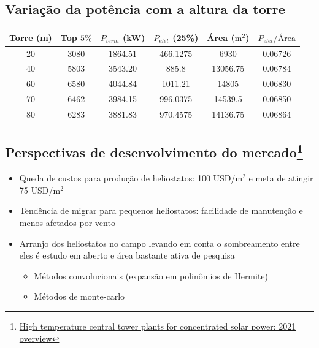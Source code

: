 \documentclass[12pt,notheorems,hyperref={pdfauthor= Rafael Nardi}]{beamer}
\begin{document}
\subsection{Variação da potência com a altura da torre}

\begin{frame}%
	\begin{table}
		\begin{tabular}[scale=0.7]{cccccc}
			\toprule
			Torre (m) & Top $5\%$ & $P_{term}$ (kW) & $P_{elet}$ (25\%) & Área ($\text{m}^2$) & $P_{elet} /\text{Área}$ \\
			\midrule
			20 & 3080 & 1864.51 & 466.1275 & 6930 & 0.06726 \\
			40 & 5803 & 3543.20 & 885.8 & 13056.75 & 0.06784 \\
			60 & 6580 & 4044.84 & 1011.21 & 14805 & 0.06830 \\
			70 & 6462 & 3984.15 & 996.0375 & 14539.5 & 0.06850 \\
			80 & 6283 & 3881.83 & 970.4575 & 14136.75 & 0.06864 \\
		\end{tabular}
	\end{table}
\end{frame}

\subsection{Perspectivas de desenvolvimento do mercado\footnote{\href{https://reader.elsevier.com/reader/sd/pii/S1364032121010923}{High temperature central tower plants for concentrated solar power: 2021 overview}}}

\begin{frame}
	\begin{itemize}
		\item Queda de custos para produção de heliostatos: 100 USD/$\text{m}^2$ e
			meta de atingir 75 USD/$\text{m}^2$ \pause
			\bigskip
		\item Tendência de migrar para pequenos heliostatos: facilidade de
			manutenção e menos afetados por vento\pause
			\bigskip
		\item Arranjo dos heliostatos no campo levando em conta o sombreamento
			entre eles é estudo em aberto e área bastante ativa de pesquisa
			\medskip
			\begin{itemize}
				\item Métodos convolucionais (expansão em polinômios de Hermite)
					\medskip
				\item Métodos de monte-carlo
			\end{itemize}
	\end{itemize}
\end{frame}
\end{document}
